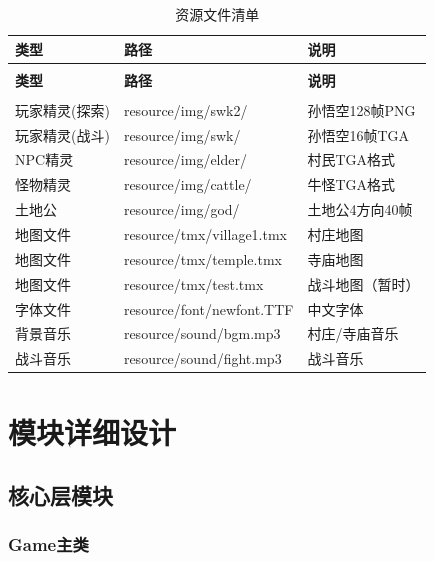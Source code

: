\documentclass[12pt,a4paper]{article}
\begin{document}
\begin{longtable}{>{\centering\arraybackslash}m{2.5cm}>{\centering\arraybackslash}m{3.5cm}>{\centering\arraybackslash}m{5cm}}
\caption{资源文件清单} \label{tab:resources} \\
\toprule
\textbf{类型} & \textbf{路径} & \textbf{说明} \\
\midrule
\endfirsthead

\toprule
\multicolumn{3}{l}{续表} \\
\textbf{类型} & \textbf{路径} & \textbf{说明} \\
\midrule
\endhead

\midrule
\multicolumn{3}{r}{续下页} \\
\endfoot

\bottomrule
\endlastfoot

玩家精灵(探索) & resource/img/swk2/ & 孙悟空128帧PNG \\
玩家精灵(战斗) & resource/img/swk/ & 孙悟空16帧TGA \\
NPC精灵 & resource/img/elder/ & 村民TGA格式 \\
怪物精灵 & resource/img/cattle/ & 牛怪TGA格式 \\
土地公 & resource/img/god/ & 土地公4方向40帧 \\
地图文件 & resource/tmx/village1.tmx & 村庄地图 \\
地图文件 & resource/tmx/temple.tmx & 寺庙地图 \\
地图文件 & resource/tmx/test.tmx & 战斗地图（暂时） \\
字体文件 & resource/font/newfont.TTF & 中文字体 \\
背景音乐 & resource/sound/bgm.mp3 & 村庄/寺庙音乐 \\
战斗音乐 & resource/sound/fight.mp3 & 战斗音乐 \\
\end{longtable}

\section{模块详细设计}

\subsection{核心层模块}

\subsubsection{Game主类}
\end{document}
